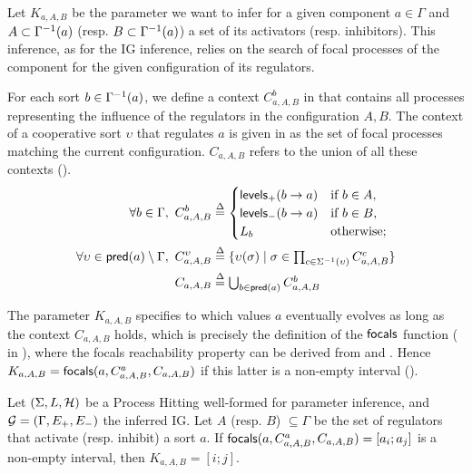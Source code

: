 Let $K_{a,A,B}$ be the parameter we want to infer for a given component $a \in \Gamma$
and $A \subset \Gamma^{-1}(a)$ (resp. $B \subset \Gamma^{-1}(a)$) a set of its activators (resp. inhibitors).
This inference, as for the IG inference, relies on the search of focal processes of the component for the given configuration of its regulators.

For each sort $b \in \Gamma^{-1}(a)$, we define a context $C^b_{a,A,B}$ in  that contains all processes representing the influence of the regulators in the configuration $A,B$.
The context of a cooperative sort $\upsilon$ that regulates $a$ is given in
 as the set of focal processes matching the current configuration.
$C_{a,A,B}$ refers to the union of all these contexts ().
\begin{align}
\label{eq:param_context}
\forall b\in\Gamma,~
C_{a,A,B}^b & \stackrel{\Delta}= \begin{cases}
\mathsf{levels}_+(b\rightarrow a) & \text{if $b \in A$,}\\
\mathsf{levels}_-(b\rightarrow a) & \text{if $b \in B$,}\\
L_b		& \text{otherwise;}\\
\end{cases}
\\
\label{eq:param_context_coop}
\forall \upsilon \in \mathsf{pred}(a)\setminus\Gamma,~
C_{a,A,B}^\upsilon & \stackrel{\Delta}= \{
\upsilon(\sigma) \mid \sigma \in \textstyle\prod_{c\in\Sigma^{-1}(\upsilon)}C_{a,A,B}^c \}
\\
C_{a,A,B} & \stackrel{\Delta}= \textstyle\bigcup_{b\in\mathsf{pred}(a)} C^b_{a,A,B}
\label{eq:K-ctx}
\end{align}

The parameter $K_{a,A,B}$ specifies to which values $a$ eventually evolves as long as the context
$C_{a,A,B}$ holds, which is precisely the definition of the $\mathsf{focals}$ function
( in ),
where the focals reachability property can be derived from  and
.
Hence $K_{a,A,B} = \mathsf{focals}(a,C^a_{a,A,B},C_{a,A,B})$ if this latter is a non-empty interval
().

\begin{proposition}
\label{pps:param_K}
Let $(\Sigma, L, \mathcal{H})$ be a Process Hitting well-formed for parameter inference, and $\mathcal{G} = (\Gamma,
E_+, E_-)$ the inferred IG.
Let $A$ (resp. $B$) $\subseteq \Gamma$ be the set of regulators that activate (resp. inhibit) a sort
$a$.
If $\mathsf{focals}(a,C^a_{a,A,B},C_{a,A,B})=[a_i;a_j]$ is a non-empty interval, 
	then $K_{a,A,B} = [i;j]$.
\end{proposition}

